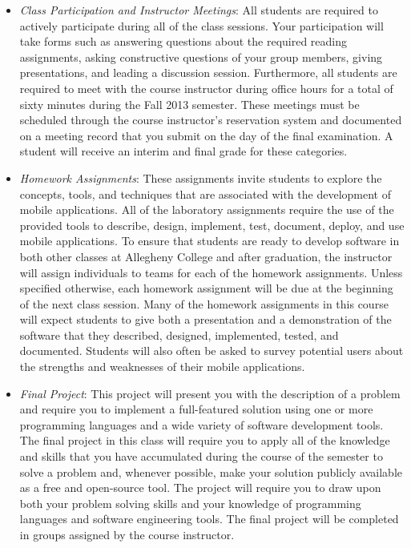 \begin{itemize}

	\item {\em Class Participation and Instructor Meetings}: All students are required to actively participate during
		all of the class sessions. Your participation will take forms such as answering questions about the required
		reading assignments, asking constructive questions of your group members, giving presentations, and leading a
		discussion session. Furthermore, all students are required to meet with the course instructor during office
		hours for a total of sixty minutes during the Fall 2013 semester.  These meetings must be scheduled through the
		course instructor's reservation system and documented on a meeting record that you submit on the day of the final
		examination. A student will receive an interim and final grade for these categories.

	\item {\em Homework Assignments}: These assignments invite students to explore the concepts, tools,
		and techniques that are associated with the development of mobile applications.  All of the
		laboratory assignments require the use of the provided tools to describe, design, implement, test, document,
		deploy, and use mobile applications.  To ensure that students are ready to develop software in both other classes at
		Allegheny College and after graduation, the instructor will assign individuals to teams for each of the
		homework assignments.  Unless specified otherwise, each homework assignment will be due at the beginning of
		the next class session.  Many of the homework assignments in this course will expect students to
		give both a presentation and a demonstration of the software that they described, designed, implemented, tested,
		and documented. Students will also often be asked to survey potential users about the strengths and weaknesses
		of their mobile applications.
	
	\item {\em Final Project}: This project will present you with the description of a problem and require you to
		implement a full-featured solution using one or more programming languages and a wide variety of software
		development tools.  The final project in this class will require you to apply all of the knowledge and skills
		that you have accumulated during the course of the semester to solve a problem and, whenever possible,
		make your solution publicly available as a free and open-source tool.  The project will require you to draw upon
		both your problem solving skills and your knowledge of programming languages and software engineering tools. The
		final project will be completed in groups assigned by the course instructor.
		
\end{itemize}

